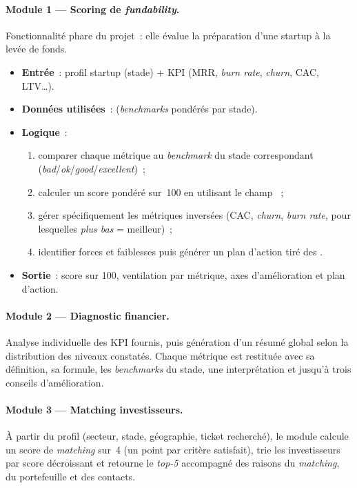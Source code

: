 \paragraph{Module 1 --- Scoring de \textit{fundability}.} Fonctionnalité phare du projet~: elle évalue la préparation d'une startup à la levée de fonds.
\begin{itemize}
  \item \textbf{Entrée}~: profil startup (stade) + \ac{KPI} (\ac{MRR}, \textit{burn rate}, \textit{churn}, \ac{CAC}, \ac{LTV}\ldots).
  \item \textbf{Données utilisées}~:  (\textit{benchmarks} pondérés par stade).
  \item \textbf{Logique}~:
  \begin{enumerate}
    \item comparer chaque métrique au \textit{benchmark} du stade correspondant (\textit{bad}/\textit{ok}/\textit{good}/\textit{excellent})~;
    \item calculer un score pondéré sur~100 en utilisant le champ ~;
    \item gérer spécifiquement les métriques inversées (\ac{CAC}, \textit{churn}, \textit{burn rate}, pour lesquelles \textit{plus bas} = meilleur)~;
    \item identifier forces et faiblesses puis générer un plan d'action tiré des .
  \end{enumerate}
  \item \textbf{Sortie}~: score sur 100, ventilation par métrique, axes d'amélioration et plan d'action.
\end{itemize}

\paragraph{Module 2 --- Diagnostic financier.} Analyse individuelle des \ac{KPI} fournis, puis génération d'un résumé global selon la distribution des niveaux constatés. Chaque métrique est restituée avec sa définition, sa formule, les \textit{benchmarks} du stade, une interprétation et jusqu'à trois conseils d'amélioration.

\paragraph{Module 3 --- Matching investisseurs.} À partir du profil (secteur, stade, géographie, ticket recherché), le module calcule un score de \textit{matching} sur~4 (un point par critère satisfait), trie les investisseurs par score décroissant et retourne le \textit{top-5} accompagné des raisons du \textit{matching}, du portefeuille et des contacts.


